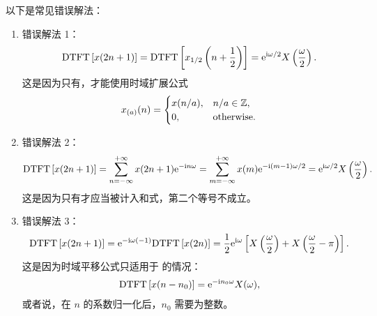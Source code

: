 \begin{note}
    以下是常见错误解法：
    \begin{enumerate}
        \item 错误解法 1：
            \begin{align*}
                \mathrm{DTFT}\left[x(2n + 1)\right] = \mathrm{DTFT}\left[x_{1/2}\left(n + \frac{1}{2}\right)\right] = \mathrm{e}^{\mathrm{i}\omega/2}X\left(\frac{\omega}{2}\right).
            \end{align*} 
            这是因为只有，才能使用时域扩展公式
            \begin{align*}
                x_{(a)}(n) = \begin{cases}
                    x(n/a), & n/a \in \mathbb{Z}, \\
                    0, & \text{otherwise}.
                \end{cases}
            \end{align*}
        \item 错误解法 2：
            \begin{align*}
                \mathrm{DTFT}\left[x(2n + 1)\right] = \sum_{n = -\infty}^{+\infty}x(2n + 1)\mathrm{e}^{-\mathrm{i} n\omega}
                    = \sum_{m = -\infty}^{+\infty}x(m)\mathrm{e}^{-\mathrm{i} (m - 1)\omega / 2}
                    = \mathrm{e}^{\mathrm{i}\omega/2}X\left(\frac{\omega}{2}\right).
            \end{align*}
            这是因为只有才应当被计入和式，第二个等号不成立。
        \item 错误解法 3：
            \begin{align*}
                \mathrm{DTFT}\left[x(2n + 1)\right] = \mathrm{e}^{-\mathrm{i}\omega(-1)}\mathrm{DTFT}\left[x(2n)\right]
                    = \frac{1}{2}\mathrm{e}^{\mathrm{i}\omega}\left[X\left(\frac{\omega}{2}\right)
                        + X\left(\frac{\omega}{2} - \pi\right)\right].
            \end{align*}
            这是因为时域平移公式只适用于  的情况：
            \begin{align*}
                \mathrm{DTFT}\left[x(n - n_0)\right] = \mathrm{e}^{-\mathrm{i} n_0\omega}X(\omega),
            \end{align*}
            或者说，在 $n$ 的系数归一化后，$n_0$ 需要为整数。
    \end{enumerate}
\end{note}

